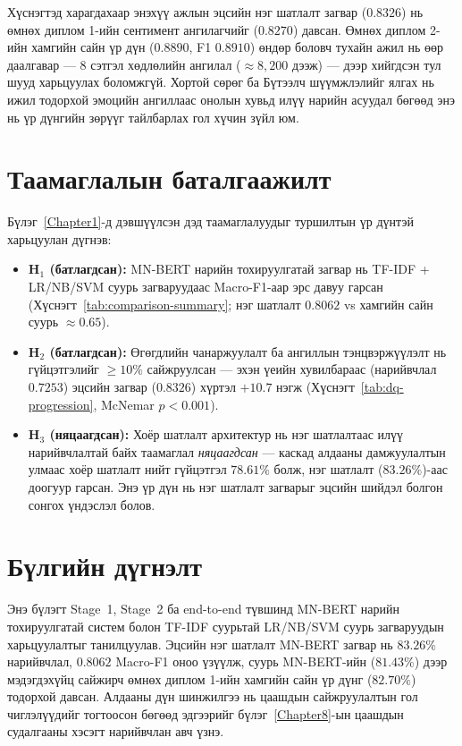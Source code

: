Хүснэгтэд харагдахаар энэхүү ажлын эцсийн нэг шатлалт загвар ($0.8326$)
нь өмнөх диплом 1-ийн сентимент ангилагчийг ($0.8270$) давсан. Өмнөх диплом 2-ийн
хамгийн сайн үр дүн ($0.8890$, F1 $0.8910$) өндөр боловч тухайн ажил нь өөр
даалгавар --- 8 сэтгэл хөдлөлийн ангилал (${\approx}8{,}200$ дээж) --- дээр
хийгдсэн тул шууд харьцуулах боломжгүй. Хортой сөрөг ба Бүтээлч шүүмжлэлийг
ялгах нь ижил тодорхой эмоцийн ангиллаас онолын хувьд илүү нарийн асуудал
бөгөөд энэ нь үр дүнгийн зөрүүг тайлбарлах гол хүчин зүйл юм.

\section{Таамаглалын баталгаажилт}
\label{sec:hypothesis-check}

Бүлэг~\ref{Chapter1}-д дэвшүүлсэн дэд таамаглалуудыг туршилтын үр дүнтэй
харьцуулан дүгнэв:

\begin{itemize}
  \item \textbf{H$_1$ (батлагдсан):} MN-BERT нарийн тохируулгатай загвар нь
    TF-IDF + LR/NB/SVM суурь загваруудаас Macro-F1-аар эрс давуу гарсан
    (Хүснэгт~\ref{tab:comparison-summary}; нэг шатлалт $0.8062$ vs хамгийн сайн
    суурь $\approx0.65$).
  \item \textbf{H$_2$ (батлагдсан):} Өгөгдлийн чанаржуулалт ба ангиллын
    тэнцвэржүүлэлт нь гүйцэтгэлийг $\geq 10\%$ сайжруулсан --- эхэн үеийн
    хувилбараас (нарийвчлал $0.7253$) эцсийн загвар ($0.8326$) хүртэл
    $+10.7$ нэгж (Хүснэгт~\ref{tab:dq-progression}, McNemar $p<0.001$).
  \item \textbf{H$_3$ (няцаагдсан):} Хоёр шатлалт архитектур нь нэг шатлалтаас
    илүү нарийвчлалтай байх таамаглал \emph{няцаагдсан} --- каскад алдааны
    дамжуулалтын улмаас хоёр шатлалт нийт гүйцэтгэл $78.61\%$ болж, нэг шатлалт
    ($83.26\%$)-аас доогуур гарсан. Энэ үр дүн нь нэг шатлалт загварыг эцсийн
    шийдэл болгон сонгох үндэслэл болов.
\end{itemize}

\section{Бүлгийн дүгнэлт}

Энэ бүлэгт Stage~1, Stage~2 ба end-to-end түвшинд MN-BERT нарийн тохируулгатай систем
болон TF-IDF суурьтай LR/NB/SVM суурь загваруудын харьцуулалтыг танилцуулав.
Эцсийн нэг шатлалт MN-BERT загвар нь $\mathbf{83.26\%}$ нарийвчлал,
$\mathbf{0.8062}$ Macro-F1 оноо үзүүлж, суурь MN-BERT-ийн ($81.43\%$) дээр
мэдэгдэхүйц сайжирч өмнөх диплом 1-ийн хамгийн сайн үр дүнг ($82.70\%$) тодорхой давсан.
Алдааны дүн шинжилгээ нь цаашдын сайжруулалтын гол чиглэлүүдийг тогтоосон
бөгөөд эдгээрийг бүлэг~\ref{Chapter8}-ын цаашдын судалгааны хэсэгт нарийвчлан авч үзнэ.
